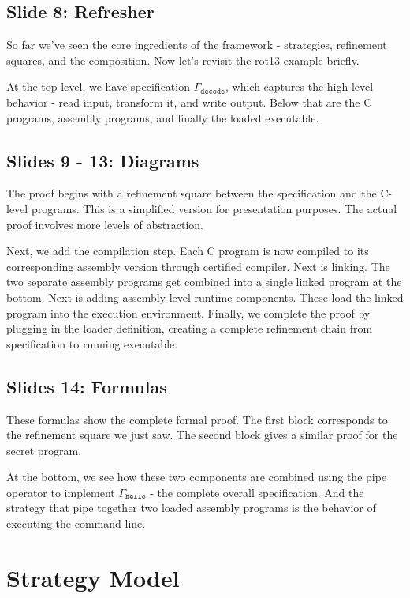\documentclass{article}
\newcommand{\kw}[1]{\ensuremath{\mathtt{#1}}}
\begin{document}
\subsection{Slide 8: Refresher}

So far we've seen the core ingredients of the framework - strategies, refinement
squares, and the composition. Now let's revisit the rot13 example briefly.

At the top level, we have specification $\Gamma_\kw{decode}$, which captures the
high-level behavior - read input, transform it, and write output. Below that are
the C programs, assembly programs, and finally the loaded executable.

\subsection{Slides 9 - 13: Diagrams}

The proof begins with a refinement square between the specification and the
C-level programs. This is a simplified version for presentation
purposes. The actual proof involves more levels of abstraction.

Next, we add the compilation step. Each C program is now compiled to its
corresponding assembly version through certified compiler. Next is linking. The
two separate assembly programs get combined into a single linked program at the
bottom. Next is adding assembly-level runtime components. These load the linked
program into the execution environment. Finally, we complete the proof by
plugging in the loader definition, creating a complete refinement chain from
specification to running executable.

\subsection{Slides 14: Formulas}

These formulas show the complete formal proof. The first block corresponds to
the refinement square we just saw. The second block gives a similar proof for
the secret program.

At the bottom, we see how these two components are combined using the pipe
operator to implement $\Gamma_\kw{hello}$ - the complete overall specification.
And the strategy that pipe together two loaded assembly programs is the behavior
of executing the command line.

\section{Strategy Model}
\end{document}
